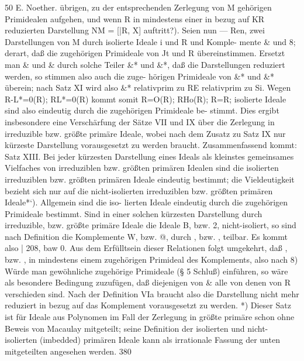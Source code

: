 \documentclass[11pt,a4paper]{article}
\theoremstyle{plain}
\theoremstyle{definition}
\begin{document}
50 
E. Noether. 
übrigen, zu der entsprechenden Zerlegung von M gehörigen Primidealen 
aufgehen, und wenn R in mindestens einer in bezug auf KR reduzierten 
Darstellung NM = [|R, X] auftritt?). 
Seien nun 
--- 
Ren, 
zwei Darstellungen von M durch isolierte Ideale i und R und Komple- 
mente \& und 8; derart, daß die zugehörigen Primideale 
von Jt und R 
übereinstimmen. 
Ersetzt man \& und \& durch solche Teiler \&* und \&*, 
daß die Darstellungen reduziert werden, so stimmen also auch die zuge- 
hörigen Primideale von \&* und \&* überein; nach Satz XI wird also \&* 
relativprim zu RE relativprim zu Si. 
Wegen 
R-L*=0(R); 
RL*=0(R) 
kommt somit 
R=O(R); 
RHo(R); 
R=R; 
isolierte Ideale sind also eindeutig durch die zugehörigen Primideale be- 
stimmt. 
Dies ergibt insbesondere eine Verschärfung der Sätze VII und IX 
über die Zerlegung in irreduzible bzw. größte primäre Ideale, wobei nach 
dem Zusatz zu Satz IX nur kürzeste Darstellung vorausgesetzt zu werden 
braucht. 
Zusammenfassend kommt: 
Satz XIII. Bei jeder kürzesten Darstellung eines Ideals als kleinstes 
gemeinsames Vielfaches von irreduziblen bzw. größten primären Idealen 
sind die isolierten irreduziblen bzw. größten primären Ideale 
eindeutig 
bestimmt; 
die 
Vieldeutigkeit 
bezieht 
sich nur auf die nicht-isolierten 
irreduziblen bzw. größten primären Ideale*`). 
Allgemein sind die iso- 
lierten Ideale eindeutig durch die zugehörigen Primideale bestimmt. 
Sind in einer solchen 
kürzesten Darstellung 
durch irreduzible, bzw. 
größte primäre Ideale 
die Ideale B, bzw. 2, nicht-isoliert, so sind nach 
Definition die Komplemente W, bzw. @, durch , bzw. , teilbar. 
Es 
kommt also 
| 
208, 
baw 
0. 
Aus dem Erfülltsein dieser Relationen folgt umgekehrt, daß , bzw. , 
in mindestens einem zugehörigen Primideal des Komplements, 
also nach 
8\textdegree{}) Würde man gewöhnliche zugehörige Primideale 
(\S{} 5 Schluß) einführen, 
so 
wäre als besondere Bedingung zuzufügen, daß diejenigen von \& alle von denen von R 
verschieden sind. 
Nach der Definition VIa braucht also die Darstellung nicht mehr 
reduziert in bezug auf das Komplement vorausgesetzt zu werden. 
*) Dieser Satz ist für Ideale aus Polynomen im Fall der Zerlegung in größte 
primäre schon ohne Beweis von Macaulay mitgeteilt; seine Definition 
der isolierten 
und nicht-isolierten 
(imbedded) primären 
Ideale kann 
als irrationale Fassung der 
unten mitgeteilten angesehen werden. 
380
\end{document}
